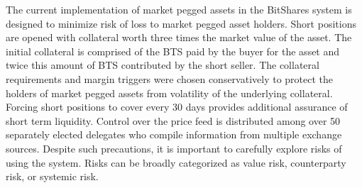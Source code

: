 The current implementation of market pegged assets in the BitShares system is
designed to minimize risk of loss to market pegged asset holders. Short
positions are opened with collateral worth three times the market value of the
asset. The initial collateral is comprised of the BTS paid by the buyer for the
asset and twice this amount of BTS contributed by the short seller. The
collateral requirements and margin triggers were chosen conservatively to
protect the holders of market pegged assets from volatility of the underlying
collateral. Forcing short positions to cover every 30 days provides additional
assurance of short term liquidity. Control over the price feed is distributed
among over 50 separately elected delegates who compile information from
multiple exchange sources. Despite such precautions, it is important to
carefully explore risks of using the system. Risks can be broadly categorized
as value risk, counterparty risk, or systemic risk.
